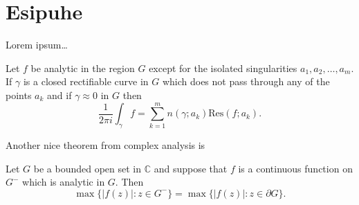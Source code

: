 


\chapter{Esipuhe}



Lorem ipsum\ldots

\begin{theorem}
Let $f$ be analytic in the region $G$ except for the isolated singularities $a_1,a_2,\ldots,a_m$. If $\gamma$ is a closed rectifiable curve in $G$ which does not pass through any of the points $a_k$ and if $\gamma\approx 0$ in $G$ then
\[
\frac{1}{2\pi i}\int_\gamma f = \sum_{k=1}^m n(\gamma;a_k) \text{Res}(f;a_k).
\]
\end{theorem}

Another nice theorem from complex analysis is

\begin{theorem}
Let $G$ be a bounded open set in $\mathbb{C}$ and suppose that $f$ is a continuous function on $G^-$ which is analytic in $G$. Then
\[
\max\{|f(z)|:z\in G^-\}=\max \{|f(z)|:z\in \partial G \}.
\]
\end{theorem}

\newcommand{\abc}{abcdefgh\hbar\hslash i\imath j\jmath klmnopqrstuvwxyz}
\newcommand{\ABC}{ABCDEFGHIJKLMNOPQRSTUVWXYZ}
\newcommand{\alphabeta}{\alpha\beta\varbeta\gamma\delta\epsilon\varepsilon\zeta\eta\theta\vartheta\iota\kappa\varkappa\lambda\mu\nu\xi o\pi\varpi\rho\varrho\sigma\varsigma\tau\upsilon\phi\varphi\chi\psi\omega}
\newcommand{\AlphaBeta}{\Gamma\Delta\Theta\Lambda\Xi\Pi\Sigma\Upsilon\Phi\Psi\Omega}










